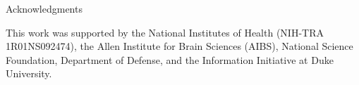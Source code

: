 \documentclass[final, table]{beamer}
\newlength{\onecolwid}
\begin{document}
\begin{frame}[t]
\begin{columns}[t]
\begin{column}{\onecolwid}
\vspace{1in}

\begin{block}{Acknowledgments} 

\tiny{This work was supported by the National Institutes of Health (NIH-TRA 1R01NS092474), the Allen Institute for Brain Sciences (AIBS), National Science Foundation, Department of Defense, and the Information Initiative at Duke University.}
\end{block} 


\vspace{-0.05in}

\end{column}


\end{columns}
\end{frame}
\end{document}
